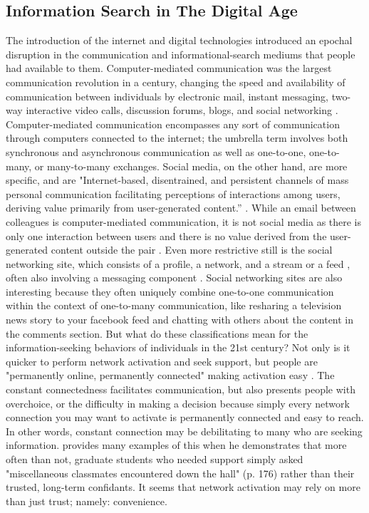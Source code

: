\subsection{Information Search in The Digital Age}

The introduction of the internet and digital technologies introduced an epochal
disruption in the communication and informational-search mediums that people had
available to them. Computer-mediated communication was the largest communication
revolution in a century, changing the speed and availability of communication
between individuals by electronic mail, instant messaging, two-way interactive
video calls, discussion forums, blogs, and social networking
\citep{rainie2012networked}. Computer-mediated communication encompasses any
sort of communication through computers connected to the internet; the umbrella
term involves both synchronous and asynchronous communication as well as
one-to-one, one-to-many, or many-to-many exchanges. Social media, on the other
hand, are more specific, and are "Internet-based, disentrained, and persistent
channels of mass personal communication facilitating perceptions of interactions
among users, deriving value primarily from user-generated content.” \citep[][p.
50]{carr2015social}. While an email between colleagues is computer-mediated
communication, it is not social media as there is only one interaction between
users and there is no value derived from the user-generated content outside the
pair \citep{bayer_etal20}. Even more restrictive still is the social networking
site, which consists of a profile, a network, and a stream or a feed
\citep{boyd2007social, ellison2013sociality,},  often also involving a messaging
component  \citep{bayer_etal20}. Social networking sites are also interesting
because they often uniquely combine one-to-one communication within the context
of one-to-many communication, like resharing a television news story to your
facebook feed and chatting with others about the content in the comments
section. But what do these classifications mean for the information-seeking
behaviors of individuals in the 21st century? Not only is it quicker to perform
network activation and seek support, but people are "permanently online,
permanently connected" making activation easy \citep{vorderer2017permanently}.
The constant connectedness facilitates communication, but also presents people
with overchoice, or the difficulty in making a decision because simply every
network connection you may want to activate is permanently connected and easy to
reach. In other words, constant connection may be debilitating to many who are
seeking information. \citet{smallSomeoneTalk2017} provides many examples of this
when he demonstrates that more often than not, graduate students who needed
support simply asked "miscellaneous classmates encountered down the hall" (p.
176) rather than their trusted, long-term confidants. It seems that network
activation may rely on more than just trust; namely: convenience.

